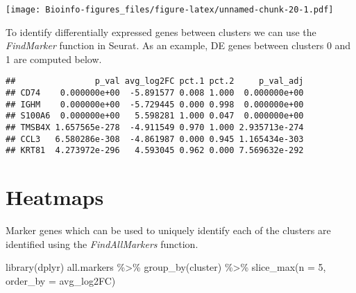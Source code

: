 \documentclass[
  openany]{book}
\newenvironment{Shaded}{\begin{snugshade}}{\end{snugshade}}
\newcommand{\AttributeTok}[1]{\textcolor[rgb]{0.77,0.63,0.00}{#1}}
\newcommand{\DecValTok}[1]{\textcolor[rgb]{0.00,0.00,0.81}{#1}}
\newcommand{\FunctionTok}[1]{\textcolor[rgb]{0.00,0.00,0.00}{#1}}
\newcommand{\NormalTok}[1]{#1}
\newcommand{\OtherTok}[1]{\textcolor[rgb]{0.56,0.35,0.01}{#1}}
\newcommand{\SpecialCharTok}[1]{\textcolor[rgb]{0.00,0.00,0.00}{#1}}
\begin{document}
\texttt{[image: Bioinfo-figures\_files/figure-latex/unnamed-chunk-20-1.pdf]}

\clearpage

To identify differentially expressed genes between clusters we can use the \emph{FindMarker} function in Seurat. As an example, DE genes between clusters 0 and 1 are computed below.

\begin{Shaded}
\end{Shaded}

\begin{verbatim}
##                p_val avg_log2FC pct.1 pct.2     p_val_adj
## CD74    0.000000e+00  -5.891577 0.008 1.000  0.000000e+00
## IGHM    0.000000e+00  -5.729445 0.000 0.998  0.000000e+00
## S100A6  0.000000e+00   5.598281 1.000 0.047  0.000000e+00
## TMSB4X 1.657565e-278  -4.911549 0.970 1.000 2.935713e-274
## CCL3   6.580286e-308  -4.861987 0.000 0.945 1.165434e-303
## KRT81  4.273972e-296   4.593045 0.962 0.000 7.569632e-292
\end{verbatim}

\clearpage

\hypertarget{heatmaps-1}{%
\section{Heatmaps}\label{heatmaps-1}}

Marker genes which can be used to uniquely identify each of the clusters are identified using the \emph{FindAllMarkers} function.

\begin{Shaded}
\begin{Highlighting}[]
\FunctionTok{library}\NormalTok{(dplyr)}
\NormalTok{all.markers }\SpecialCharTok{\%\textgreater{}\%}
  \FunctionTok{group\_by}\NormalTok{(cluster) }\SpecialCharTok{\%\textgreater{}\%}
  \FunctionTok{slice\_max}\NormalTok{(}\AttributeTok{n =} \DecValTok{5}\NormalTok{, }\AttributeTok{order\_by =}\NormalTok{ avg\_log2FC)}
\end{Highlighting}
\end{Shaded}
\end{document}
